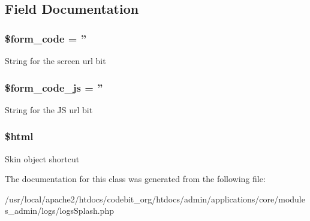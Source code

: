 \subsection{Field Documentation}
\hypertarget{classadmin__core__logs__logs_splash_af28aee726fa3eb6c355d08a2ab655e03}{
\subsubsection[{\$form\-\_\-code}]{\setlength{\rightskip}{0pt plus 5cm}\$form\-\_\-code = ''}}\label{classadmin__core__logs__logs_splash_af28aee726fa3eb6c355d08a2ab655e03}
String for the screen url bit \hypertarget{classadmin__core__logs__logs_splash_ac68fe8a02a2efd63c3271179f4b4fbb7}{
\subsubsection[{\$form\-\_\-code\-\_\-js}]{\setlength{\rightskip}{0pt plus 5cm}\$form\-\_\-code\-\_\-js = ''}}\label{classadmin__core__logs__logs_splash_ac68fe8a02a2efd63c3271179f4b4fbb7}
String for the J\-S url bit \hypertarget{classadmin__core__logs__logs_splash_a6f96e7fc92441776c9d1cd3386663b40}{
\subsubsection[{\$html}]{\setlength{\rightskip}{0pt plus 5cm}\$html\hspace{0.3cm}{\ttfamily [protected]}}}\label{classadmin__core__logs__logs_splash_a6f96e7fc92441776c9d1cd3386663b40}
Skin object shortcut 

The documentation for this class was generated from the following file\-:\begin{DoxyCompactItemize}
\item 
/usr/local/apache2/htdocs/codebit\-\_\-org/htdocs/admin/applications/core/modules\-\_\-admin/logs/logs\-Splash.\-php\end{DoxyCompactItemize}
